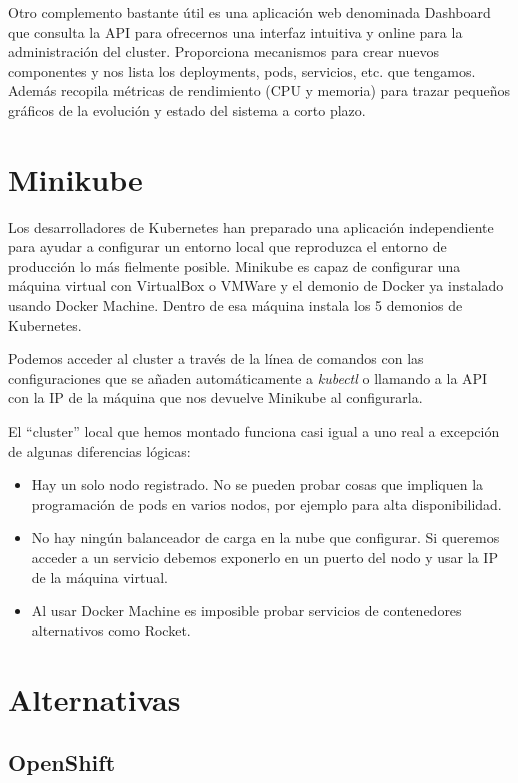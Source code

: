 Otro complemento bastante útil es una aplicación web denominada Dashboard que consulta la API para ofrecernos una interfaz intuitiva y online para la administración del cluster. Proporciona mecanismos para crear nuevos componentes y nos lista los deployments, pods, servicios, etc. que tengamos. Además recopila métricas de rendimiento (CPU y memoria) para trazar pequeños gráficos de la evolución y estado del sistema a corto plazo.

\section{Minikube}
\label{sec:minikube}

Los desarrolladores de Kubernetes han preparado una aplicación independiente para ayudar a configurar un entorno local que reproduzca el entorno de producción lo más fielmente posible. Minikube es capaz de configurar una máquina virtual con VirtualBox o VMWare y el demonio de Docker ya instalado usando Docker Machine\cite{dockermachine}. Dentro de esa máquina instala los 5 demonios de Kubernetes.

Podemos acceder al cluster a través de la línea de comandos con las configuraciones que se añaden automáticamente a \emph{kubectl} o llamando a la API con la IP de la máquina que nos devuelve Minikube al configurarla.

El ``cluster'' local que hemos montado funciona casi igual a uno real a excepción de algunas diferencias lógicas\cite{minikube}:
\begin{itemize}
  \item Hay un solo nodo registrado. No se pueden probar cosas que impliquen la programación de pods en varios nodos, por ejemplo para alta disponibilidad.
  \item No hay ningún balanceador de carga en la nube que configurar. Si queremos acceder a un servicio debemos exponerlo en un puerto del nodo y usar la IP de la máquina virtual.
  \item Al usar Docker Machine es imposible probar servicios de contenedores alternativos como Rocket.
\end{itemize}

\section{Alternativas}
\label{sec:k8s-alternativas}

\subsection{OpenShift}
\label{subsec:k8s-alternativas-openshift}

